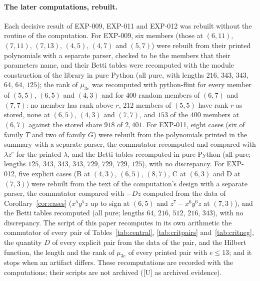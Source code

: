 \documentclass[11pt]{article}
\theoremstyle{definition}
\theoremstyle{remark}
\newcommand{\EXP}[1]{\mbox{EXP-#1}}
\begin{document}
\paragraph{The later computations, rebuilt.} Each decisive result of \EXP{009}, \EXP{011} and \EXP{012} was rebuilt without the routine of the computation. For \EXP{009}, six members (those at $(6,11)$, $(7,11)$, $(7,13)$, $(4,5)$, $(4,7)$ and $(5,7)$) were rebuilt from their printed polynomials with a separate parser, checked to be the members that their parameters name, and their Betti tables were recomputed with the module construction of the library in pure Python (all pure, with lengths $216$, $343$, $343$, $64$, $64$, $125$); the rank of $\mu_{3e}$ was recomputed with python-flint for every member of $(5,5)$, $(6,5)$ and $(4,3)$ and for $400$ random members of $(6,7)$ and $(7,7)$: no member has rank above $r$, $212$ members of $(5,5)$ have rank $r$ as stored, none at $(6,5)$, $(4,3)$ and $(7,7)$, and $153$ of the $400$ members at $(6,7)$ against the stored share $918$ of $2{,}401$. For \EXP{011}, eight cases (six of family $T$ and two of family $G$) were rebuilt from the polynomials printed in the summary with a separate parser, the commutator recomputed and compared with $\lambda z^e$ for the printed $\lambda$, and the Betti tables recomputed in pure Python (all pure; lengths $125$, $343$, $343$, $343$, $729$, $729$, $729$, $125$), with no discrepancy. For \EXP{012}, five explicit cases (B at $(4,3)$, $(6,5)$, $(8,7)$, C at $(6,3)$ and D at $(7,3)$) were rebuilt from the text of the computation's design with a separate parser, the commutator compared with $-Dz$ computed from the data of Corollary~\ref{cor:cases} ($x^5y^5z$ up to sign at $(6,5)$ and $z^7-x^6y^6z$ at $(7,3)$), and the Betti tables recomputed (all pure; lengths $64$, $216$, $512$, $216$, $343$), with no discrepancy. The script of this paper recomputes in its own arithmetic the commutator of every pair of Tables~\ref{tab:central}, \ref{tab:critpairs} and~\ref{tab:critneg}, the quantity $D$ of every explicit pair from the data of the pair, and the Hilbert function, the length and the rank of $\mu_{3e}$ of every printed pair with $e\le13$; and it stops when an artifact differs. These recomputations are recorded with the computations; their scripts are not archived ([U] as archived evidence).
\end{document}
